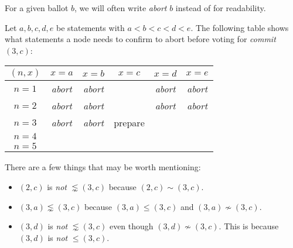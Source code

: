 \begin{rem}[Abort]
    For a given ballot $b$, we will often write \textit{abort} $b$ instead of  for readability.
\end{rem}

\begin{exmp}
    Let $a, b, c, d, e$ be statements with $a < b < c < d < e$.
    The following table shows what statements a node needs to confirm to abort before voting for \textit{commit} $(3, c)$:
    \begin{center}
        \begin{tabular}{|c|c|c|c|c|c|}
            \hline
            $(n, x)$ & $x = a$                           & $x = b$                           & $x = c$ & $x = d$                           & $x = e$                           \\ \hline
            $n = 1$  & \cellcolor{blue!25}\textit{abort} & \cellcolor{blue!25}\textit{abort} &         & \cellcolor{blue!25}\textit{abort} & \cellcolor{blue!25}\textit{abort} \\ \hline
            $n = 2$  & \cellcolor{blue!25}\textit{abort} & \cellcolor{blue!25}\textit{abort} &         & \cellcolor{blue!25}\textit{abort} & \cellcolor{blue!25}\textit{abort} \\ \hline
            $n = 3$  & \cellcolor{blue!25}\textit{abort} & \cellcolor{blue!25}\textit{abort} & prepare &                                   &                                   \\ \hline
            $n = 4$  &                                   &                                   &         &                                   &                                   \\ \hline
            $n = 5$  &                                   &                                   &         &                                   &                                   \\ \hline
        \end{tabular}
    \end{center}

    There are a few things that may be worth mentioning:
    \begin{itemize}
        \item
            $(2, c)$ is \textit{not} $\lnsim (3, c)$ because $(2, c) \sim (3, c)$.
        \item
            $(3, a) \lnsim (3, c)$ because $(3, a) \leq (3, c)$ and $(3, a) \nsim (3, c)$.
        \item
            $(3, d)$ is \textit{not} $\lnsim (3, c)$ even though $(3, d) \nsim (3, c)$.
            This is because $(3, d)$ is \textit{not} $\leq (3, c)$.
    \end{itemize}


\end{exmp}
